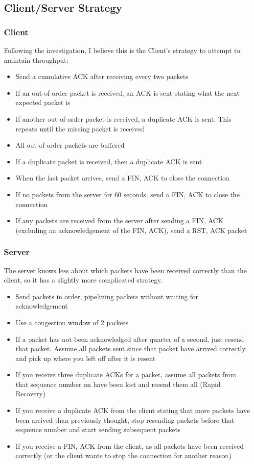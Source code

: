 \documentclass[12pt]{article}
\begin{document}
\subsection*{Client/Server Strategy}
\subsubsection*{Client}
Following the investigation, I believe this is the Client's strategy to attempt to maintain throughput:
\begin{itemize}
  \item Send a cumulative ACK after receiving every two packets
  \item If an out-of-order packet is received, an ACK is sent stating what the next expected packet is
  \item If another out-of-order packet is received, a duplicate ACK is sent. This repeats until the missing packet is received
  \item All out-of-order packets are buffered
  \item If a duplicate packet is received, then a duplicate ACK is sent
  \item When the last packet arrives, send a FIN, ACK to close the connection
  \item If no packets from the server for 60 seconds, send a FIN, ACK to close the connection
  \item If any packets are received from the server after sending a FIN, ACK (excluding an acknowledgement of the FIN, ACK), send a RST, ACK packet
\end{itemize}

\subsubsection*{Server}
The server knows less about which packets have been received correctly than the client, so it has a slightly more complicated strategy.
\begin{itemize}
  \item Send packets in order, pipelining packets without waiting for acknowledgement
  \item Use a congestion window of 2 packets
  \item If a packet has not been acknowledged after quarter of a second, just resend that packet. Assume all packets sent since that packet have arrived correctly and pick up where you left off after it is resent
  \item If you receive three duplicate ACKs for a packet, assume all packets from that sequence number on have been lost and resend them all (Rapid Recovery)
  \item If you receive a duplicate ACK from the client stating that more packets have been arrived than previously thought, stop resending packets before that sequence number and start sending subsequent packets
  \item If you receive a FIN, ACK from the client, as all packets have been received correctly (or the client wants to stop the connection for another reason)
\end{itemize}
\end{document}
